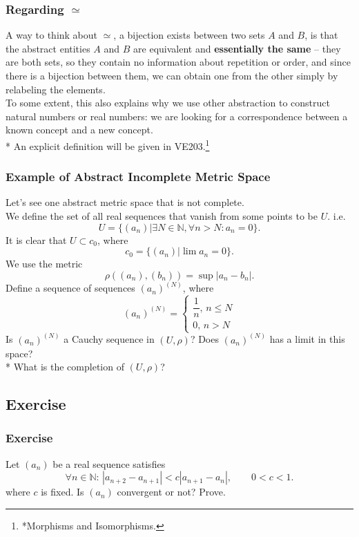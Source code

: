 \documentclass[10pt, t]{beamer}
\newcommand{\N}{\mathbb{N}}
\newcommand{\nullspace}{~\\[15pt]}
\begin{document}
\begin{frame}
    \frametitle{Regarding $\simeq$}

    A way to think about $\simeq$, a bijection exists between two sets $A$ and $B$, is that the abstract entities  $A$ and $B$ are equivalent and \textbf{essentially the same} -- they are both sets, so they contain no information about repetition or order, and since there is a bijection between them, we can obtain one from the other simply by relabeling the elements.
    \nullspace
    To some extent, this also explains why we use other abstraction to construct natural numbers or real numbers: we are looking for a correspondence between a known concept and a new concept.
    \nullspace
    * An explicit definition will be given in VE203.\footnote[frame]{*Morphisms and Isomorphisms.}

\end{frame}

\begin{frame}
    \frametitle{Example of Abstract Incomplete Metric Space}
    Let's see one abstract metric space that is not complete.\\[8pt] We define the set of all real sequences that vanish from some points to be $U$. i.e.
    $$U=\{(a_n)|\exists N\in\N,\forall n>N:a_n=0\}.$$
    It is clear that $U\subset c_0$, where $$c_0=\{(a_n)|\lim a_n = 0\}.$$
    We use the metric $$\rho((a_n),(b_n))=\sup|a_n-b_n|.$$
    Define a sequence of sequences $(a_n)^{(N)}$, where $$(a_n)^{(N)}=\left\{\begin{matrix}
            \dfrac{1}{n},\, n\leq N \\[8pt]
            0,\, n>N
        \end{matrix}\right.$$
    Is $(a_n)^{(N)}$ a Cauchy sequence in $(U,\rho)$? Does $(a_n)^{(N)}$ has a limit in this space? \\ * What is the completion of $(U,\rho)$?

\end{frame}

\subsection{Exercise}
\begin{frame}
    \frametitle{Exercise}

    Let $(a_n)$ be a real sequence satisfies
    $$\forall n\in\N: \,|a_{n+2}-a_{n+1}|<c|a_{n+1}-a_{n}|,\qquad 0<c<1.$$
    where $c$ is fixed. Is $(a_n)$ convergent or not? Prove.

\end{frame}
\end{document}
